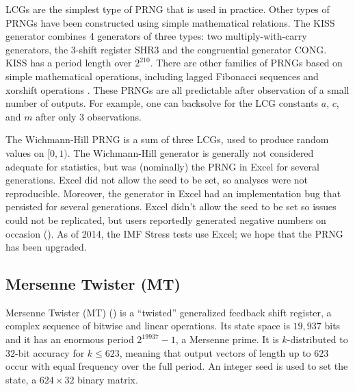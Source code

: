 \documentclass[graybox]{svmult}
\newcommand{\todo}[1]{{\color{red}{TO DO: \sc #1}}}
\begin{document}
LCGs are the simplest type of PRNG that is used in practice.
Other types of PRNGs have been constructed using simple mathematical relations.
The KISS generator combines 4 generators of three types: two multiply-with-carry
generators, the 3-shift register SHR3 and the congruential generator CONG.
KISS has a period length over $2^{210}$.
There are other families of PRNGs based on simple mathematical operations, including lagged Fibonacci sequences and xorshift operations \todo{CITE}.
These PRNGs are all predictable after observation of a small number of outputs.
For example, one can backsolve for the LCG constants $a$, $c$, and $m$ after only 3 observations.

The Wichmann-Hill PRNG is a sum of three LCGs, used to produce random values on $[0, 1)$.
%
The Wichmann-Hill generator is generally not considered adequate for statistics, but was (nominally) the PRNG in Excel for several generations. 
Excel did not allow the seed to be set, so analyses were not reproducible.
Moreover, the generator in Excel had an implementation bug that persisted for several generations.
Excel didn't allow the seed to be set so issues could not be replicated, but users reportedly generated negative numbers on occasion (\cite{mccullough_microsoft_2008}).
As of 2014, the IMF Stress tests use Excel; we hope that the PRNG has been upgraded.
\todo{cite this}

\subsection{Mersenne Twister (MT)}

Mersenne Twister (MT) (\cite{matsumoto_mersenne_1998}) is a ``twisted'' generalized feedback shift register, a complex sequence of bitwise and linear operations.
Its state space is $19,937$ bits and it has an enormous period $2^{19937}-1$, a Mersenne prime.
It is $k$-distributed to $32$-bit accuracy for $k \leq 623$, meaning that output vectors of length up to $623$ occur with equal frequency over the full period.
An integer seed is used to set the state, a $624 \times 32$ binary matrix.
\end{document}
